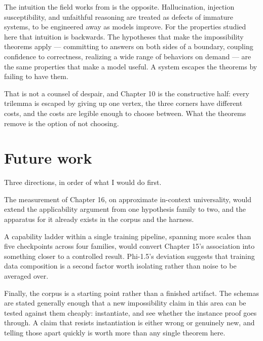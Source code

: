 \documentclass{memoir}
\begin{document}
The intuition the field works from is the opposite. Hallucination, injection
susceptibility, and unfaithful reasoning are treated as defects of immature
systems, to be engineered away as models improve. For the properties studied
here that intuition is backwards. The hypotheses that make the impossibility
theorems apply — committing to answers on both sides of a boundary, coupling
confidence to correctness, realizing a wide range of behaviors on demand — are
the same properties that make a model useful. A system escapes the theorems by
failing to have them.

That is not a counsel of despair, and Chapter 10 is the constructive half: every
trilemma is escaped by giving up one vertex, the three corners have different
costs, and the costs are legible enough to choose between. What the theorems
remove is the option of not choosing.



\section{Future work}\label{Two--Schemas--of--Impossibility-005F-005F-005F--Machine--Checked--Limits--of--Trustworthy--Machine--Learning-005F-005F-005F--and--Why--They--Tighten--with--Capability----Conclusion----Future--work}

Three directions, in order of what I would do first.

The measurement of Chapter 16, on approximate in-context universality, would
extend the applicability argument from one hypothesis family to two, and the
apparatus for it already exists in the corpus and the harness.

A capability ladder within a single training pipeline, spanning more scales than
five checkpoints across four families, would convert Chapter 15's association
into something closer to a controlled result. Phi-1.5's deviation suggests that
training data composition is a second factor worth isolating rather than
noise to be averaged over.

Finally, the corpus is a starting point rather than a finished artifact. The
schemas are stated generally enough that a new impossibility claim in this area
can be tested against them cheaply: instantiate, and see whether the instance
proof goes through. A claim that resists instantiation is either wrong or genuinely
new, and telling those apart quickly is worth more than any single theorem here.
\end{document}
